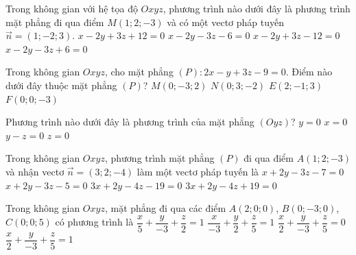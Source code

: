 \begin{ex}%
	Trong không gian với hệ tọa độ $Oxyz$, phương trình nào dưới đây là phương trình mặt phẳng  đi qua điểm $M(1;2;-3)$ và có một vectơ pháp tuyến $\overrightarrow{n} = (1;-2;3)$.
	 \choice
		{\True $x - 2y + 3z  + 12 = 0$}
		{$x - 2y - 3z  - 6 = 0$}
		{$x - 2y + 3z - 12  = 0$}
		{$x - 2y - 3z  + 6 = 0$}
\end{ex}

\begin{ex}%
	Trong không gian $Oxyz$, cho mặt phẳng $(P)\colon 2x-y+3z-9=0$. Điểm nào dưới đây thuộc mặt phẳng $(P)$? 
	 \choice
		 {$M(0;-3;2)$}
		 {$N(0;3;-2)$}
		{$E(2;-1;3)$} 
		{\True$F(0;0;-3)$} 
\end{ex}

\begin{ex}%
	Phương trình nào dưới đây là phương trình  của mặt phẳng $(Oyz)$?
	\choice 
		 {$y=0$}
		{\True $x=0$} 
		{$y-z=0$} 
		{$z=0$} 
\end{ex}

\begin{ex}%
	Trong  không gian $Oxyz$, phương trình mặt phẳng $(P)$ đi qua điểm $A(1;2;-3)$ và nhận vectơ $\overrightarrow{n}=(3;2;-4)$ làm một vectơ pháp tuyến là
	 \choice
		 {$x+2y-3z-7=0$}
		 {$x+2y-3z-5=0$}
		{\True $3x+2y-4z-19=0$} 
		 {$3x+2y-4z+19=0$}
\end{ex}

\begin{ex}%
	Trong không gian $Oxyz$, mặt phẳng đi qua  các điểm $A(2;0;0)$, $B(0;-3;0)$, $C(0;0;5)$ có phương trình là
	 \choice
		 {$\dfrac{x}{5}+\dfrac{y}{-3}+\dfrac{z}{2}=1$}
		 {$\dfrac{x}{-3}+\dfrac{y}{2}+\dfrac{z}{5}=1$}
		{$\dfrac{x}{2}+\dfrac{y}{-3}+\dfrac{z}{5}=0$} 
		{\True $\dfrac{x}{2}+\dfrac{y}{-3}+\dfrac{z}{5}=1$} 
\end{ex}


